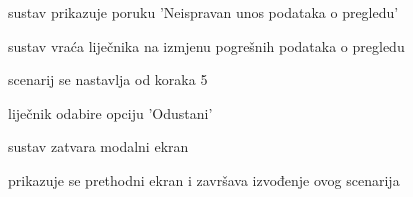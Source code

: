 \begin{packed_item}
\begin{packed_item}
\begin{packed_enum}
								\item sustav prikazuje poruku 'Neispravan unos podataka o pregledu'
								\item sustav vraća liječnika na izmjenu pogrešnih podataka o pregledu
								\item scenarij se nastavlja od koraka 5
							\end{packed_enum}
							\item [7.b] liječnik odabire opciju 'Odustani'
							\item [] \begin{packed_enum}
								\item sustav zatvara modalni ekran
								\item prikazuje se prethodni ekran i završava izvođenje ovog scenarija
							\end{packed_enum}
						\end{packed_item}
						
					\end{packed_item}

